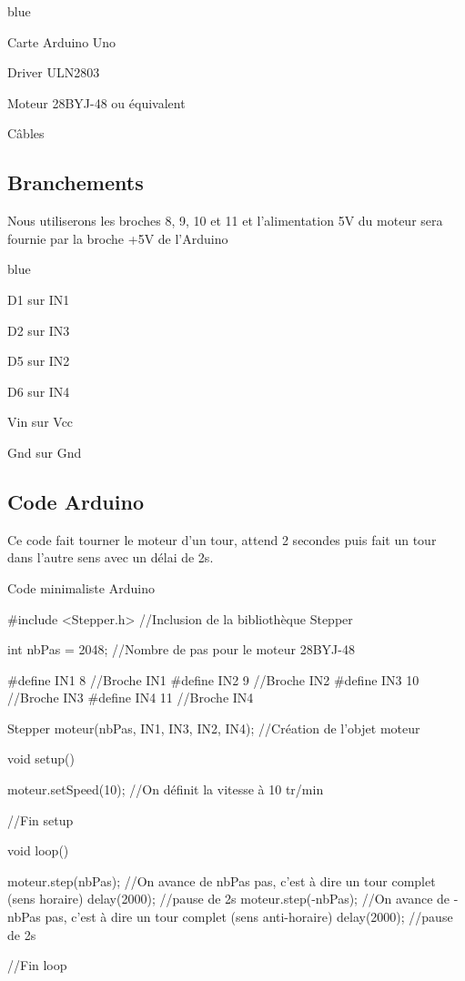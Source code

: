 \begin{items}{blue}{\Bullet}
  \item Carte Arduino Uno
  \item Driver ULN2803
  \item Moteur \pap 28BYJ-48 ou équivalent
  \item Câbles
\end{items}


\subsection{Branchements}

Nous utiliserons les broches 8, 9, 10 et 11 et  l'alimentation 5V du moteur sera fournie par la broche +5V de l'Arduino

\begin{items}{blue}{\Bullet}
  \item D1 sur IN1
  \item D2 sur IN3
  \item D5 sur IN2
  \item D6 sur IN4
  \item Vin sur Vcc
  \item Gnd sur Gnd
\end{items}


\subsection{Code Arduino}

Ce code fait tourner le moteur d'un tour, attend 2 secondes puis fait un tour dans l'autre sens avec un délai de 2s.

\begin{Cpp}{Code minimaliste Arduino}

#include <Stepper.h> //Inclusion de la bibliothèque Stepper

int nbPas = 2048; //Nombre de pas pour le moteur 28BYJ-48

#define IN1 8  //Broche IN1
#define IN2 9  //Broche IN2
#define IN3 10  //Broche IN3
#define IN4 11  //Broche IN4

Stepper moteur(nbPas, IN1, IN3, IN2, IN4); //Création de l'objet moteur
   
  void setup() {

    moteur.setSpeed(10); //On définit la vitesse à 10 tr/min

  }//Fin setup
   
  void loop() {

    moteur.step(nbPas);   //On avance de nbPas pas, c'est à dire un tour complet (sens horaire)
    delay(2000);          //pause de 2s
    moteur.step(-nbPas);  //On avance de -nbPas pas, c'est à dire un tour complet (sens anti-horaire)
    delay(2000);          //pause de 2s

  }//Fin loop
\end{Cpp}


